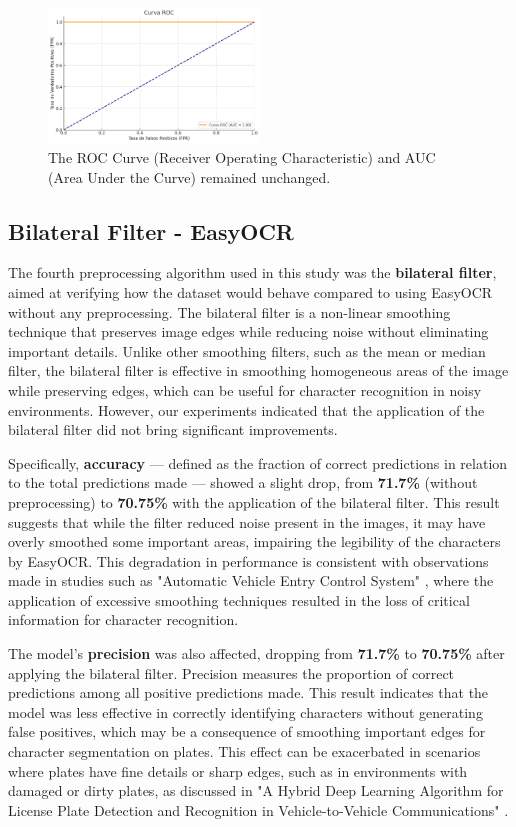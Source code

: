 \documentclass[conference]{IEEEtran}
\begin{document}
	\begin{figure}[htbp]
		\centerline{\includegraphics[width=0.5\textwidth]{img10.png}}
		\caption{The ROC Curve (Receiver Operating Characteristic) and AUC (Area Under the Curve) remained unchanged.}
		\label{img10}
	\end{figure}
	
	\subsection{Bilateral Filter - EasyOCR}
	
	
	The fourth preprocessing algorithm used in this study was the \textbf{bilateral filter}, aimed at verifying how the dataset would behave compared to using EasyOCR without any preprocessing. The bilateral filter is a non-linear smoothing technique that preserves image edges while reducing noise without eliminating important details. Unlike other smoothing filters, such as the mean or median filter, the bilateral filter is effective in smoothing homogeneous areas of the image while preserving edges, which can be useful for character recognition in noisy environments. However, our experiments indicated that the application of the bilateral filter did not bring significant improvements.
	
	Specifically, \textbf{accuracy} — defined as the fraction of correct predictions in relation to the total predictions made — showed a slight drop, from \textbf{71.7\%} (without preprocessing) to \textbf{70.75\%} with the application of the bilateral filter. This result suggests that while the filter reduced noise present in the images, it may have overly smoothed some important areas, impairing the legibility of the characters by EasyOCR. This degradation in performance is consistent with observations made in studies such as "Automatic Vehicle Entry Control System" \cite{b9}, where the application of excessive smoothing techniques resulted in the loss of critical information for character recognition.
	
	The model's \textbf{precision} was also affected, dropping from \textbf{71.7\%} to \textbf{70.75\%} after applying the bilateral filter. Precision measures the proportion of correct predictions among all positive predictions made. This result indicates that the model was less effective in correctly identifying characters without generating false positives, which may be a consequence of smoothing important edges for character segmentation on plates. This effect can be exacerbated in scenarios where plates have fine details or sharp edges, such as in environments with damaged or dirty plates, as discussed in "A Hybrid Deep Learning Algorithm for License Plate Detection and Recognition in Vehicle-to-Vehicle Communications" \cite{b7}.
	
\end{document}

